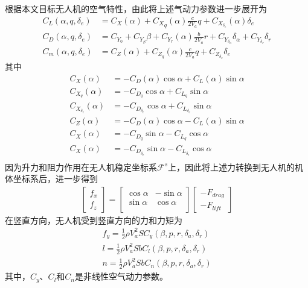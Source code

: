 根据本文目标无人机的空气特性，由此将上述气动力参数进一步展开为
\begin{align}
	C_L(\alpha, q, \delta_e) &= C_X(\alpha) + {C_X}_q(\alpha) \frac{c}{2V_a}  q+ C_{X_{{\delta}_e}}(\alpha) \delta_e \\
	C_D(\alpha, q, \delta_e) &= C_{Y_{0}} + C_{Y_{\beta}} \beta + C_{Y_r}(\alpha) \frac{b}{2V_a} r+ C_{Y_{\delta_\alpha}} \delta_\alpha +  C_{Y_{\delta_r}} \delta_r  \\ 
	C_m(\alpha, q, \delta_e) &= C_Z(\alpha) + C_{Z_q}(\alpha) \frac{c}{2V_a}  q+ C_{Z_{\delta_e}} \delta_e
\end{align}
其中
\begin{align}
	C_X(\alpha) &= -C_D(\alpha) \cos \alpha +  C_L(\alpha) \sin \alpha \\
	C_{X_q}(\alpha) &= -C_{D_q} \cos \alpha +  C_{L_q} \sin \alpha \\
	C_{X_{\delta_e}}(\alpha) &= -C_{D_{\delta_e}} \cos \alpha +  C_{L_{\delta_e}} \sin \alpha \\
	C_Z(\alpha) &= -C_D(\alpha) \cos \alpha -  C_L(\alpha) \sin \alpha \\
	C_X(\alpha) &= -C_{D_q} \sin \alpha -  C_{L_q} \cos \alpha \\
	C_X(\alpha) &= -C_{D_{\delta_e}}  \sin \alpha -  C_{L_{\delta_e}} \cos \alpha \\
\end{align}
因为升力和阻力作用在无人机稳定坐标系$\mathcal{F}^s$上，因此将上述力转换到无人机的机体坐标系后，进一步得到
\begin{align}
	\begin{bmatrix} f_x    \\ f_z  \end{bmatrix} = \begin{bmatrix}
		\cos \alpha    & - \sin \alpha  \\
		\sin \alpha       & \cos \alpha  \\
	\end{bmatrix} \begin{bmatrix} -F_{drag}    \\ -F_{lift}  \end{bmatrix}
\end{align}
在竖直方向，无人机受到竖直方向的力和力矩为
\begin{align}
	f_y = \frac{1}{2} \rho V_a^2 S C_y (\beta, p, r, \delta_a, \delta_r) \\
	l  = \frac{1}{2} \rho V_a^2 S b  C_l (\beta, p, r, \delta_a, \delta_r) \\
	n = \frac{1}{2} \rho V_a^2 S b C_n (\beta, p, r, \delta_a, \delta_r)
\end{align}
其中，$C_y$、$C_l$和$C_n$是非线性空气动力参数。

